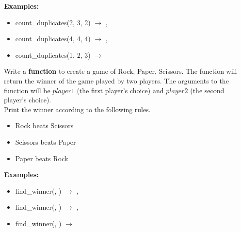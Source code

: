 		\textbf{Examples:}		
		\begin{itemize}
			\item  count\_duplicates(2, 3, 2) $\rightarrow$ , 
			\item  count\_duplicates(4, 4, 4) $\rightarrow$ , 
			\item  count\_duplicates(1, 2, 3) $\rightarrow$  
		\end{itemize}



	\item 
		Write a \textbf{function} to create a game of Rock, Paper, Scissors. The function will return the winner of the game played by two players.
		The arguments to the function will be $player1$ (the first player's choice) and $player2$ (the second player's choice).\\
		Print the winner according to the following rules. 
		\begin{itemize}
			\item Rock beats Scissors
			\item Scissors beats Paper
			\item Paper beats Rock
		\end{itemize}		
		\textbf{Examples:}		
		\begin{itemize}
			\item  find\_winner(, ) $\rightarrow$ , 
			\item  find\_winner(, ) $\rightarrow$ , 
			\item  find\_winner(\csq{Rock}, ) $\rightarrow$ 
		\end{itemize}


